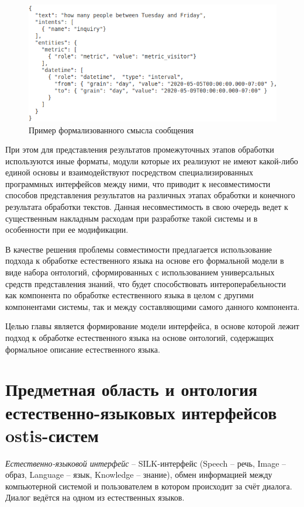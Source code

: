 \begin{figure}[h]
    \centerline{\includegraphics[width=\linewidth]{images/part4/chapter_nl_interfaces/message_intents.png}}
    \caption{Пример формализованного смысла сообщения}
    \label{fig:message_intents}
\end{figure}

При этом для представления результатов промежуточных этапов обработки используются иные форматы, модули которые их реализуют не имеют какой-либо единой основы и взаимодействуют посредством специализированных программных интерфейсов между ними, что приводит к несовместимости способов представления результатов на различных этапах обработки и конечного результата обработки текстов. Данная несовместимость в свою очередь ведет к существенным накладным расходам при разработке такой системы и в особенности при ее модификации.

В качестве решения проблемы совместимости предлагается использование подхода к обработке естественного языка на основе его формальной модели в виде набора онтологий, сформированных с использованием универсальных средств представления знаний, что будет способствовать интероперабельности как компонента по обработке естественного языка в целом с другими компонентами системы, так и между составляющими самого данного компонента.

Целью главы является формирование модели интерфейса, в основе которой лежит подход к обработке естественного языка на основе онтологий, содержащих формальное описание естественного языка.

\section{Предметная область и онтология естественно-языковых интерфейсов ostis-систем}

\textit{Естественно-языковой интерфейс} -- SILK-интерфейс (Speech – речь, Image – образ, Language – язык, Knowledge – знание), обмен информацией между компьютерной системой и пользователем в котором происходит за счёт диалога. Диалог ведётся на одном из естественных языков.

